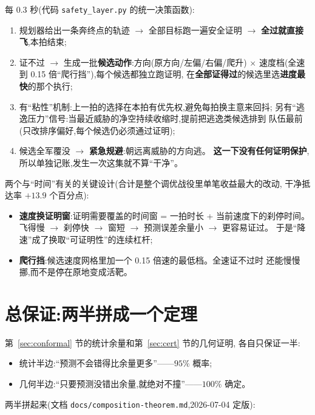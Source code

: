 \documentclass[11pt]{ctexart}
\newcommand{\code}[1]{\texttt{#1}}
\begin{document}
每 0.3 秒(代码 \code{safety\_layer.py} 的统一决策函数):

\begin{enumerate}
  \item 规划器给出一条奔终点的轨迹 $\to$ 全部目标跑一遍安全证明 $\to$
        \textbf{全过就直接飞},本拍结束;
  \item 证不过 $\to$ 生成一批\textbf{候选动作}:方向(原方向/左偏/右偏/爬升)
        $\times$ 速度档(全速到 0.15 倍``爬行挡''),每个候选都独立跑证明,
        在\textbf{全部证得过}的候选里选\textbf{进度最快}的那个执行;
  \item 有``粘性''机制:上一拍的选择在本拍有优先权,避免每拍换主意来回抖;
        另有``逃逸压力''信号:当最近威胁的净空持续收缩时,提前把逃逸类候选排到
        队伍最前(只改排序偏好,每个候选仍必须通过证明);
  \item 候选全军覆没 $\to$ \textbf{紧急规避}:朝远离威胁的方向逃。
        \textbf{这一下没有任何证明保护},所以单独记账,发生一次这集就不算``干净''。
\end{enumerate}

两个与``时间''有关的关键设计(合计是整个调优战役里单笔收益最大的改动,
干净抵达率 $+13.9$ 个百分点):
\begin{itemize}
  \item \textbf{速度换证明窗}:证明需要覆盖的时间窗 = 一拍时长 + 当前速度下的刹停时间。
        飞得慢 $\to$ 刹停快 $\to$ 窗短 $\to$ 预测误差余量小 $\to$ 更容易证过。
        于是``降速''成了换取``可证明性''的连续杠杆;
  \item \textbf{爬行挡}:候选速度网格里加一个 0.15 倍速的最低档。全速证不过时
        还能慢慢挪,而不是停在原地变成活靶。
\end{itemize}

\section{总保证:两半拼成一个定理}\label{sec:theorem}

第~\ref{sec:conformal} 节的统计余量和第~\ref{sec:cert} 节的几何证明,
各自只保证一半:
\begin{itemize}
  \item 统计半边:``预测不会错得比余量更多''——$95\%$ 概率;
  \item 几何半边:``只要预测没错出余量,就绝对不撞''——$100\%$ 确定。
\end{itemize}
两半拼起来(文档 \code{docs/composition-theorem.md},2026-07-04 定版):

\begin{center}
\end{center}
\end{document}
